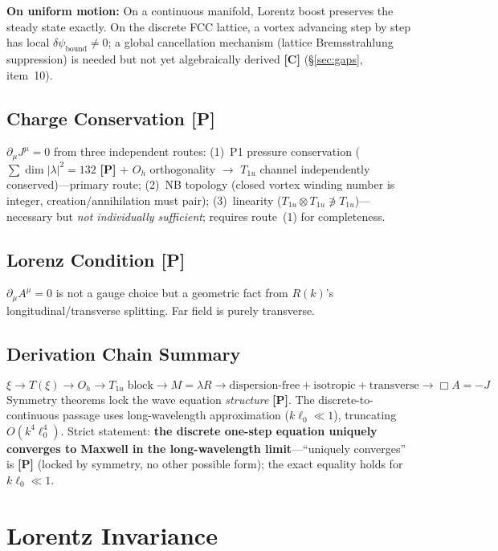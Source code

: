 \documentclass[11pt,a4paper]{article}
\newcommand{\gradeP}{\textbf{[P]}}
\newcommand{\gradeC}{\textbf{[C]}}
\begin{document}
\textbf{On uniform motion:} On a continuous manifold, Lorentz boost preserves the steady state exactly. On the discrete FCC lattice, a vortex advancing step by step has local $\delta\psi_{\mathrm{bound}} \neq 0$; a global cancellation mechanism (lattice Bremsstrahlung suppression) is needed but not yet algebraically derived \gradeC{} (\S\ref{sec:gaps}, item~10).

\subsection{Charge Conservation \gradeP}
$\partial_\mu J^\mu = 0$ from three independent routes: (1)~P1 pressure conservation ($\sum\dim|\lambda|^2 = 132$ \gradeP{} $+$ $O_h$ orthogonality $\to$ $T_{1u}$ channel independently conserved)---primary route; (2)~NB topology (closed vortex winding number is integer, creation/annihilation must pair); (3)~linearity ($T_{1u}\otimes T_{1u}\not\ni T_{1u}$)---necessary but \emph{not individually sufficient}; requires route~(1) for completeness.

\subsection{Lorenz Condition \gradeP}
$\partial_\mu A^\mu = 0$ is not a gauge choice but a geometric fact from $R(k)$'s longitudinal/transverse splitting. Far field is purely transverse.

\subsection{Derivation Chain Summary}
$$\xi \to T(\xi) \to O_h \to T_{1u}\;\text{block} \to M=\lambda R \to \text{dispersion-free}+\text{isotropic}+\text{transverse} \to \Box A = -J$$
Symmetry theorems lock the wave equation \emph{structure} \gradeP. The discrete-to-continuous passage uses long-wavelength approximation ($k\ell_0\ll 1$), truncating $O(k^4\ell_0^4)$. Strict statement: \textbf{the discrete one-step equation uniquely converges to Maxwell in the long-wavelength limit}---``uniquely converges'' is \gradeP{} (locked by symmetry, no other possible form); the exact equality holds for $k\ell_0\ll 1$.

\section{Lorentz Invariance}\label{sec:lorentz}
\end{document}
